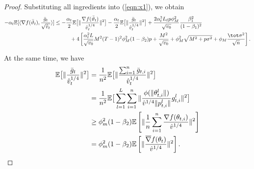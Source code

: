 \documentclass[manuscript,screen,review]{acmart}
\begin{document}
\begin{proof}
Substituting all ingredients into (\ref{eqn:x1}), we obtain
\begin{align}\notag
    -\alpha_t \mathbb E[\langle \nabla f(\bar \vartheta_t),\frac{\bar g_t}{\sqrt{\hat v_t}} \rangle] &\leq -\frac{\alpha_t}{2}\mathbb E\big[\Vert \frac{\nabla f(\bar\vartheta_t) }{\hat v_t^{1/4}}\Vert^2 \big]-\frac{\alpha_t}{2}\mathbb E\big[\Vert \frac{\bar g_t }{\hat v_t^{1/4}}\Vert^2 \big]+\frac{2\alpha_t^3 L_\ell p\phi_M^2}{ \sqrt{v_0}}\frac{\beta_1^2}{(1-\beta_1)^2} \\\notag
    &\hspace{0.4in}  + 4 \left[ \frac{\alpha_t^2 L}{\sqrt{v_0}} M^2 (T-1)^2 \phi_M^2 (1-\beta_2)p + \frac{M^2}{\sqrt{v_0}}+\phi_M^2\sqrt{M^2+p\sigma^2} + \phi_M \frac{\tot \sigma^2}{\sqrt{n}}\right].
\end{align}


At the same time, we have
\begin{align}\notag
    \mathbb E\big[\Vert \frac{\bar g_t }{\hat v_t^{1/4}}\Vert^2\big]&=\frac{1}{n^2}\mathbb E\big[\Vert \frac{\sum_{i=1}^n \bar g_{t,i}}{\hat v_t^{1/4}}\Vert^2 \big]\\\notag
    &=\frac{1}{n^2}\mathbb E\big[ \sum_{l=1}^L \sum_{i=1}^n \Vert  \frac{\phi(\Vert \theta_{t,i}^l\Vert)}{\hat v^{1/4} \Vert p_{t,i}^l\Vert}g_{t,i}^l \Vert^2 \big]\\\notag
    &\geq \phi_m^2(1-\beta_2) \mathbb E\left[ \Vert \frac{1}{n}\sum_{i=1}^n \frac{\nabla f(\theta_{t,i})}{\hat v^{1/4}} \Vert^2 \right]\\\notag
    &=\phi_m^2(1-\beta_2) \mathbb E\left[ \Vert  \frac{\overline\nabla f(\theta_{t})}{\hat v^{1/4}} \Vert^2 \right].
\end{align}




\end{proof}
\end{document}
